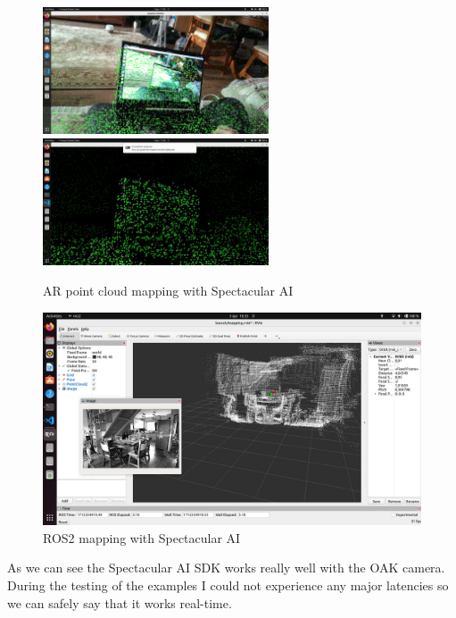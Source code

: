 \begin{figure}[htbp]
	\centering
	\includegraphics[width=67mm, keepaspectratio]{figures/spectacular_ai_mapping_ar_pc1.png}\hspace{1cm}
	\includegraphics[width=67mm, keepaspectratio]{figures/spectacular_ai_mapping_ar_pc2.png}\\\vspace{5mm}
	\caption{AR point cloud mapping with Spectacular AI}
    \label{fig:SPAI_point_cloud_mapping}
\end{figure}

\begin{figure}[htbp]
	\centering
	\includegraphics[width=150mm, keepaspectratio]{figures/spectacular_ai_mapping_ros2.png}
	\caption{ROS2 mapping with Spectacular AI}
	\label{fig:SPAI_ros_mapping}
\end{figure}

As we can see the Spectacular AI SDK works really well with the OAK camera. During the testing of the examples I could not experience any major latencies so we can safely say that it works real-time.

